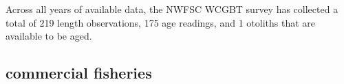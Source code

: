 \documentclass[11pt,
  english,
  letterpaper,
]{article}
\begin{document}
\leavevmode\tagmcend\tagstructend\par


Across all years of available data, the NWFSC WCGBT survey has collected a total of 219 length observations, 175 age readings, and 1 otoliths that are available to be aged.

\leavevmode\tagmcend\tagstructend\par


\hypertarget{commercial-fisheries-37}{%
\subsection{commercial fisheries}\label{commercial-fisheries-37}}

\leavevmode\tagmcend\tagstructend


\begingroup\fontsize{10}{12}\selectfont \begingroup\fontsize{10}{12}\selectfont

\leavevmode\tagmcend\tagstructend\par
\end{document}
